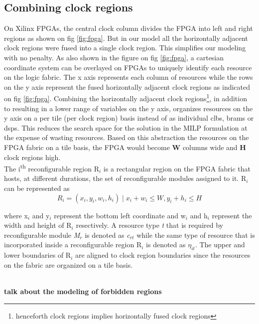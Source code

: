 \subsection{Combining clock regions}
On Xilinx FPGAs, the central clock column divides the FPGA into left and right regions as shown on fig \ref{fig:fpga}. But in our model all the horizontally adjacent clock regions were fused into a single clock region. This simplifies our modeling with no penalty. As also shown in the figure on fig \ref{fig:fpga}, a cartesian coordinate system can be overlayed on FPGAs to uniquely identify each resource on the logic fabric. The x axis represents each column of resources while the rows on the y axis represent the fused horizontally adjacent clock regions as indicated on fig \ref{fig:fpga}. Combining the horizontally adjacent clock regions\footnote{henceforth clock regions implies horizontally fused clock regions}, in addition to resulting in a lower range of variables on the y axis, organizes resources on the y axis on a per tile (per clock region) basis instead of as individual clbs, brams or dsps. This reduces the search space for the solution in the MILP formulation at the expense of wasting resources. Based on this abstraction the resources on the FPGA fabric on a tile basis, the FPGA would become \textbf{W} columns wide and \textbf{H} clock regions high.  \\

The i\textsuperscript{th} reconfigurable region R$_i$ is a rectangular region on the FPGA fabric that hosts, at different durations, the set of reconfigurable modules assigned to it. R$_i$ can be represented as
\begin{equation}
R_i = (x_i, y_i, w_i, h_i) \mid x_i + w_i \leq W, y_i + h_i \leq H
\end{equation}

where x$_i$ and y$_i$ represent the bottom left coordinate and w$_i$ and h$_i$ represent the width and height of R$_i$ resectively. A resource type \textit{t} that is required by reconfigurable module \textit{M$_r$} is denoted as \textit{c$_{rt}$} while the same type of resource that is incorporated inside a reconfigurable region R$_i$ is denoted as $\eta_{it}$. The upper and lower boundaries of R$_i$ are aligned to clock region boundaries since the resources on the fabric are organized on a tile basis. 

\textbf{\\talk about the modeling of forbidden regions}

